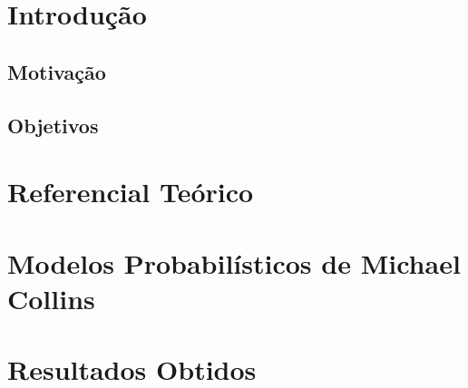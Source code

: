 \documentclass[a4paper]{abnt}
\begin{document}
\tableofcontents
\listoffigures
\listoftables

%


\setcounter{page}{1}


\chapter{Introdução}
\label{cha:introducao}
    

\section{Motivação}
\label{cha:motivacao}
	

\section{Objetivos}
\label{cha:objetivos}
	

\chapter{Referencial Teórico}
\label{cha:referencial_teorico}
	

%	

\chapter{Modelos Probabilísticos de Michael Collins}
\label{cha:michael_collins}
	

%	

%	

\chapter{Resultados Obtidos}
\label{cha:resultados_parciais}
	
\end{document}
